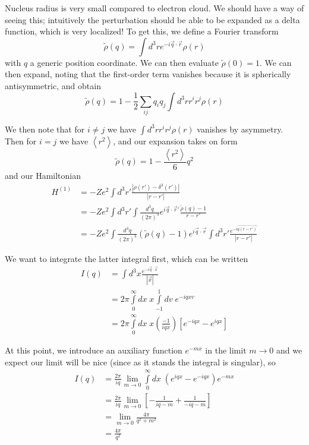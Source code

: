\documentclass[10pt]{report}
\newcommand{\abs}[1]{\left|#1\right|}
\newcommand{\expvalue}[1]{\left<#1\right>}
\begin{document}
Nucleus radius is very small compared to electron cloud. We should have a way of seeing this; intuitively the perturbation should be able to be expanded as a delta function, which is very localized! To get this, we define a Fourier transform
$$\tilde{\rho}(q) = \int d^3r e^{-i\vec{q}\cdot \vec{r}}\rho(r)$$
with $q$ a generic position coordinate. We can then evaluate $\tilde{\rho}(0) = 1$. We can then expand, noting that the first-order term vanishes because it is spherically antisymmetric, and obtain
$$\tilde{\rho}(q) = 1-\frac{1}{2}\sum_{ij}q_iq_j\int d^3r r^ir^j \rho(r)$$

We then note that for $i \neq j$ we have $\int d^3r r^i r^j \rho(r)$ vanishes by asymmetry. Then for $i=j$ we have $\expvalue{r^2}$, and our expansion takes on form
$$\tilde{\rho}(q) = 1-\frac{\expvalue{r^2}}{6}q^2$$
and our Hamiltonian
\begin{align}
    H^{(1)} &= -Ze^2\int d^3r' \frac{\abs{\rho(r') - \delta^3(r')}}{\abs{r-r'}}\\
    &= -Ze^2 \int d^3r' \int \frac{d^3q}{(2\pi)^3} e^{i\vec{q}\cdot \vec{r}'}\frac{\tilde{\rho}(q) - 1}{r-r'}\\
    &= -Ze^2 \int \frac{d^3q}{(2\pi)^3} (\tilde{\rho}(q) - 1)e^{i\vec{q}\cdot \vec{r}}\int d^3 r'\frac{e^{-i\vec{q(r-r')}}}{\abs{r-r'}}
    \label{1.17.one}
\end{align}

We want to integrate the latter integral first, which can be written 
\begin{align}
    I(q) &= \int d^3x\frac{e^{-i\vec{q}\cdot \vec{x}}}{\abs{\vec{x}}}\\
    &= 2\pi\displaystyle\int\limits_{0}^{\infty}dx\; x \displaystyle\int\limits_{-1}^{1}dv\;e^{-iqxv}\\
    &= 2\pi\displaystyle\int\limits_{0}^{\infty}dx\;x\left( \frac{-1}{iqx} \right)\left[ e^{-iqx} - e^{iqx} \right]
\end{align}

At this point, we introduce an auxiliary function $e^{-mx}$ in the limit $m \to 0$ and we expect our limit will be nice (since as it stands the integral is singular), so
\begin{align}
    I(q) &= \frac{2\pi}{iq}\lim_{m \to 0}\displaystyle\int\limits_{0}^{\infty}dx\;\left( e^{iqx} - e^{-iqx} \right)e^{-mx}\\
    &= \frac{2\pi}{iq}\lim_{m \to 0}\left[ -\frac{1}{iq-m} + \frac{1}{-iq-m} \right]\\
    &= \lim_{m \to 0}\frac{4\pi}{q^2 + m^2}\\
    &= \frac{4\pi}{q^2}
\end{align}
\end{document}
